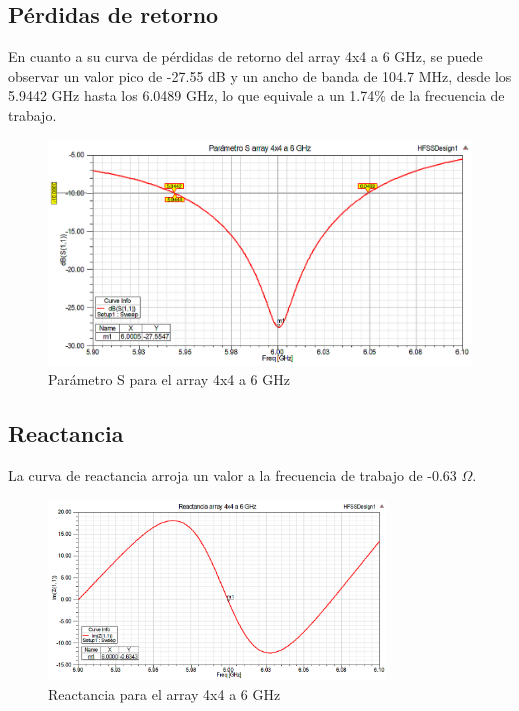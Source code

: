 \subsection{Pérdidas de retorno}
\par En cuanto a su curva de pérdidas de retorno del array 4x4 a 6 GHz, se puede observar un valor pico de -27.55 dB y un ancho de banda de 104.7 MHz, desde los 5.9442 GHz hasta los 6.0489 GHz, lo que equivale a un 1.74\% de la frecuencia de trabajo.
\\
\begin{figure}[H]
    \centering
        \includegraphics[width=\textwidth]{archivos/analisis/4x42/1}
        \caption{Parámetro S para el array 4x4 a 6 GHz}
        \label{fig:s4x42}
\end{figure}

\newpage
\subsection{Reactancia}
\par La curva de reactancia arroja un valor a la frecuencia de trabajo de -0.63 $\Omega$. 
\\
\begin{figure}[H]
    \centering
        \includegraphics[width=0.8\textwidth]{archivos/analisis/4x42/2}
        \caption{Reactancia para el array 4x4 a 6 GHz}
        \label{fig:react4x42}
\end{figure}

